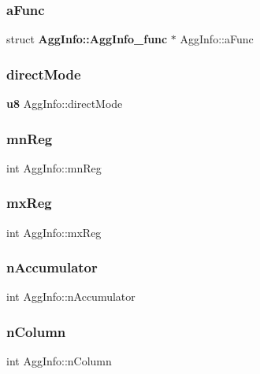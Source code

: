 \mbox{\label{struct_agg_info_a4e201acd6a1f8aed360c58e45f47c803}} 
\subsubsection{aFunc}
{\footnotesize\ttfamily struct \textbf{ Agg\+Info\+::\+Agg\+Info\+\_\+func} $\ast$ Agg\+Info\+::a\+Func}

\mbox{\label{struct_agg_info_aaa57d294016ac7e17e7cacaa7b25634e}} 
\subsubsection{directMode}
{\footnotesize\ttfamily \textbf{ u8} Agg\+Info\+::direct\+Mode}

\mbox{\label{struct_agg_info_aa9a656c3db8fe0f2905062bbcc55efdc}} 
\subsubsection{mnReg}
{\footnotesize\ttfamily int Agg\+Info\+::mn\+Reg}

\mbox{\label{struct_agg_info_a7aec99396ee3da0bdd985685de1b9da2}} 
\subsubsection{mxReg}
{\footnotesize\ttfamily int Agg\+Info\+::mx\+Reg}

\mbox{\label{struct_agg_info_ad2251760d95af9024f0a3170405cb53b}} 
\subsubsection{nAccumulator}
{\footnotesize\ttfamily int Agg\+Info\+::n\+Accumulator}

\mbox{\label{struct_agg_info_a9cbfa5fc33328cf3500426674e036a8b}} 
\subsubsection{nColumn}
{\footnotesize\ttfamily int Agg\+Info\+::n\+Column}

